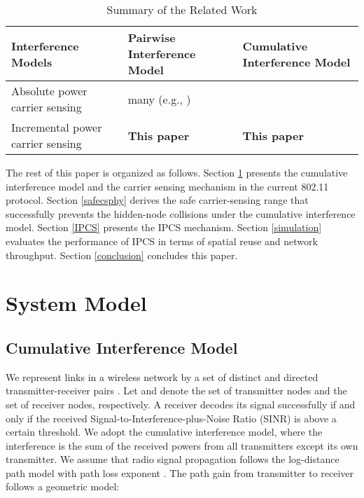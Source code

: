 \documentclass[conference]{IEEEtran}
\begin{document}
\begin{table}[tb]
\caption{Summary of the Related Work}
\begin{center}
\renewcommand{\arraystretch}{1.3}
\footnotesize
\begin{tabular}{m{65pt}||m{68pt}|m{68pt}}
\hline \centering Interference Models & \centering Pairwise Interference
Model &\centering Cumulative Interference Model
\tabularnewline \hline\hline \centering Absolute power carrier sensing  & \centering many (e.g.,
\cite{LiBin,KXu})  &\centering \cite{TaeSuk,TingYu}
\tabularnewline \hline \centering Incremental power carrier sensing  &\centering
\textbf{This paper}&\centering \textbf{This paper}
\tabularnewline \hline
\end{tabular}
\end{center}
\label{Relatework}
\end{table}

The rest of this paper is organized as follows. Section \ref{system}
presents the cumulative interference model and the carrier sensing
mechanism in the current 802.11 protocol. Section \ref{safecsphy}
derives the safe carrier-sensing range that successfully prevents
the hidden-node collisions under the cumulative interference model.
Section \ref{IPCS} presents the IPCS mechanism. Section
\ref{simulation} evaluates the performance of IPCS in terms of
spatial reuse and network throughput. Section \ref{conclusion}
concludes this paper.



\section{System Model}\label{system}

\subsection{Cumulative Interference Model}\label{Model}

We represent links in a wireless network by a set of distinct and
directed transmitter-receiver pairs . Let  and  denote the set of transmitter nodes
and the set of receiver nodes, respectively. A receiver decodes its
signal successfully if and only if the received
Signal-to-Interference-plus-Noise Ratio (SINR) is above a certain
threshold. We adopt the cumulative interference model, where the
interference is the sum of the received powers from all transmitters
except its own transmitter. We assume that radio signal propagation
follows the log-distance path model with path loss exponent
. The path gain  from transmitter  to
receiver  follows a geometric model:
\end{document}
